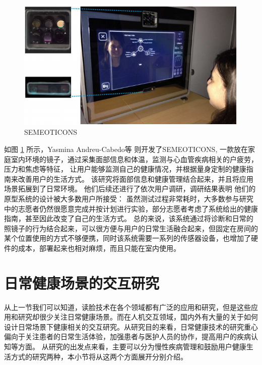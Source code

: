 \begin{figure}[h]
    \centering
    \includegraphics[width=12cm]{images/mirror.png}
    \caption{SEMEOTICONS}
    \label{fig:seme}
\end{figure}
如图 \ref{fig:seme} 所示，Yasmina Andreu-Cabedo等  \cite{andreu2015mirror}则开发了SEMEOTICONS, 一款放在家庭室内环境的镜子，通过采集面部信息和体温，监测与心血管疾病相关的户疲劳，压力和焦虑等特征， 让用户能够监测自己的健康情况，并根据量身定制的健康指南来改善用户的生活方式。
 该研究将面部信息和健康管理结合起来，并且将应用场景拓展到了日常环境。
 他们后续还进行了依次用户调研，调研结果表明\cite{coppini2017user} 他们的原型系统的设计被大多数用户所接受： 虽然测试过程非常耗时，大多数参与研究中的志愿者仍然很愿意完成并按计划进行实验，部分志愿者考虑了系统给出的健康指南，甚至因此改变了自己的生活方式。
总的来说，该系统通过将诊断和日常的照镜子的行为结合起来，可以很方便与用户的日常生活融合起来，但固定在房间的某个位置使用的方式不够便携，同时该系统需要一系列的传感器设备，也增加了硬件的成本，部署起来也相对麻烦，而且只能在室内使用。

\section{日常健康场景的交互研究}

从上一节我们可以知道，读脸技术在各个领域都有广泛的应用和研究，但是这些应用和研究却很少关注日常健康场景。而在人机交互领域，国内外有大量的关于如何设计日常场景下健康相关的交互研究。从研究目的来看，日常健康技术的研究重心偏向于关注患者的日常生活体验，加强患者与医护人员的协作，提高用户的疾病认知等方面\cite{nunes2015self-care}。
从研究的出发点来看，主要可以分为慢性疾病管理和鼓励用户健康生活方式的研究两种\cite{nunes2015self-care}，本小节将从这两个方面展开分别介绍。

